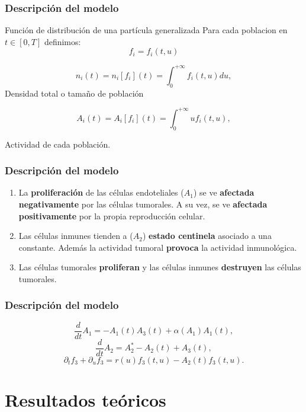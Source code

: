 \documentclass{beamer}
\begin{document}
\begin{frame}
	\frametitle{Descripción del modelo}
	\begin{block}{Función de distribución de una partícula generalizada}
		Para cada poblacion en $t\in[0,T]$ definimos:
		$$f_i=f_i(t,u)$$
	\end{block}

	$$
	n_i(t)= n_i [f_i] (t) =\int_{0}^{+\infty} f_i (t, u) du,
	$$	Densidad total o tamaño de población 
	
	$$A_i (t) = A_i [f_i] (t) =\int_{0}^{+\infty}uf_i(t,u),$$
	
	Actividad de cada población.
\end{frame}


\begin{frame}
	\frametitle{Descripción del modelo}
	\begin{enumerate}
		\item La \textbf{proliferación} de las células endoteliales ($A_1$) se ve \textbf{afectada negativamente} por las células tumorales. A su vez, se ve \textbf{afectada positivamente} por la propia reproducción celular.
		\item Las células inmunes tienden a ($A_2$) \textbf{estado centinela} asociado a una constante. Además la actividad tumoral \textbf{provoca} la actividad inmunológica.
		\item Las células tumorales\textbf{ proliferan} y las células inmunes \textbf{destruyen} las células tumorales.
	\end{enumerate}
\end{frame}

\begin{frame}
	\frametitle{Descripción del modelo}
\begin{equation}
\frac{d}{dt}A_1=-A_1(t)A_3(t)+\alpha(A_1)A_1(t),
\end{equation}
\begin{equation}
\frac{d}{dt}A_2=A_2^*-A_2(t)+A_3(t),
\end{equation}
\begin{equation}
\partial_tf_3+\partial_uf_3=r(u)f_3(t,u)-A_2(t)f_3(t,u).
\end{equation}
\end{frame}




\section{Resultados teóricos}
\end{document}
